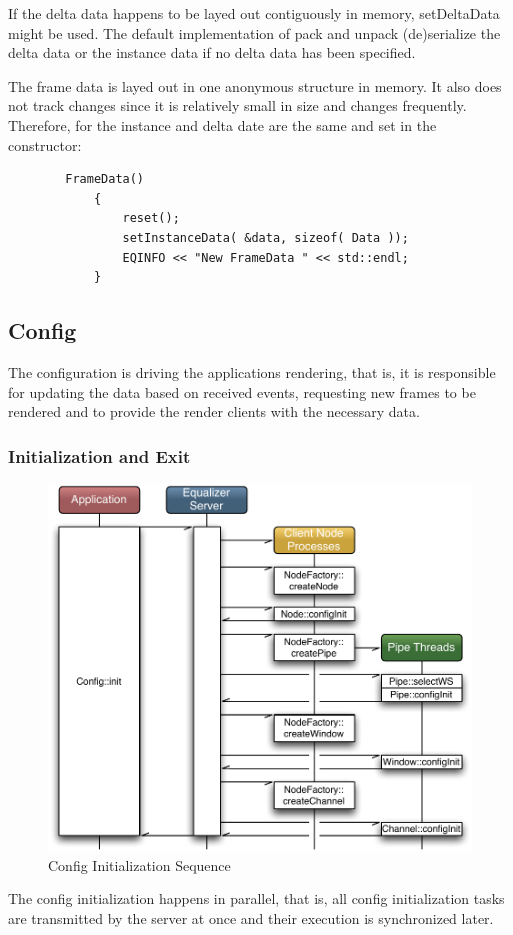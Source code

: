 \documentclass[10pt,a4]{scrartcl}
\begin{document}
If the delta data happens to be layed out contiguously in memory,
\textsf{setDeltaData} might be used. The default implementation of
\textsf{pack} and \textsf{unpack} (de)serialize the delta data or the
instance data if no delta data has been specified.

The frame data is layed out in one anonymous structure in
memory. It also does not track changes since it is relatively small in
size and changes frequently. Therefore, for the instance and delta
date are the same and set in the constructor:

{\footnotesize\begin{lstlisting}
        FrameData()
            {
                reset();
                setInstanceData( &data, sizeof( Data ));
                EQINFO << "New FrameData " << std::endl;
            }
\end{lstlisting}}%

\subsection{Config}

The configuration is driving the applications rendering, that is, it is
responsible for updating the data based on received events, requesting
new frames to be rendered and to provide the render clients with the
necessary data.

\subsubsection{Initialization and Exit}

\begin{figure}
  \includegraphics[width=.6\textwidth]{images/configInit.pdf}
  {\caption{\small\label{fConfigInit}Config Initialization Sequence}}
\end{figure}
The config initialization happens in parallel, that is, all config
initialization tasks are transmitted by the server at once and their
execution is synchronized later. 
\end{document}

